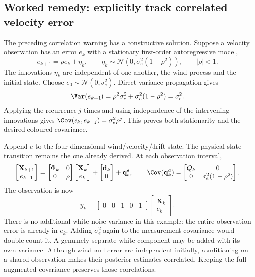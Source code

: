 \subsection{Worked remedy: explicitly track correlated velocity error}
The preceding correlation warning has a constructive solution. Suppose a velocity observation has an error $e_k$ with a stationary first-order autoregressive model,
\begin{equation}
 e_{k+1}=\rho e_k+\eta_k,\qquad
 \eta_k\sim\mathcal N(0,\sigma_e^2(1-\rho^2)),\qquad |\rho|<1.
\end{equation}
The innovations $\eta_k$ are independent of one another, the wind process and the initial state. Choose $e_0\sim\mathcal N(0,\sigma_e^2)$. Direct variance propagation gives
\begin{equation}
 \Var(e_{k+1})=\rho^2\sigma_e^2+\sigma_e^2(1-\rho^2)=\sigma_e^2.
\end{equation}
Applying the recurrence $j$ times and using independence of the intervening innovations gives $\Cov(e_k,e_{k+j})=\sigma_e^2\rho^j$. This proves both stationarity and the desired coloured covariance.

Append $e$ to the four-dimensional wind/velocity/drift state. The physical state transition remains the one already derived. At each observation interval,
\begin{equation}
 \begin{bmatrix}\mathbf X_{k+1}\\e_{k+1}\end{bmatrix}
 =\begin{bmatrix}\Phi_k&0\\0&\rho\end{bmatrix}
 \begin{bmatrix}\mathbf X_k\\e_k\end{bmatrix}
 +\begin{bmatrix}\mathbf d_k\\0\end{bmatrix}+\mathbf q^a_k,
 \qquad
 \Cov(\mathbf q^a_k)=\begin{bmatrix}Q_k&0\\0&\sigma_e^2(1-\rho^2)\end{bmatrix}.
\end{equation}
The observation is now
\begin{equation}
 \boxed{y_k=\begin{bmatrix}0&0&1&0&1\end{bmatrix}
 \begin{bmatrix}\mathbf X_k\\e_k\end{bmatrix}.}
\end{equation}
There is no additional white-noise variance in this example: the entire observation error is already in $e_k$. Adding $\sigma_e^2$ again to the measurement covariance would double count it. A genuinely separate white component may be added with its own variance. Although wind and error are independent initially, conditioning on a shared observation makes their posterior estimates correlated. Keeping the full augmented covariance preserves those correlations.

